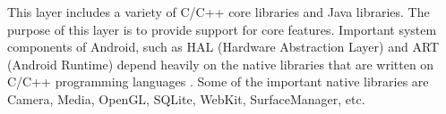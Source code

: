 This layer includes a variety of C/C++ core libraries and Java libraries. The purpose of this layer is to provide support for core features. Important system components of Android, such as HAL (Hardware Abstraction Layer) and ART (Android Runtime) depend heavily on the native libraries that are written on C/C++ programming languages \cite{7}. Some of the important native libraries are Camera, Media, OpenGL, SQLite, WebKit, SurfaceManager, etc.